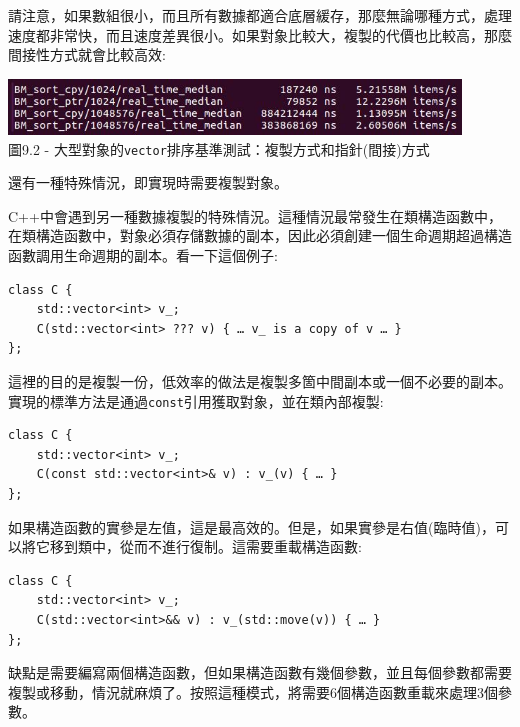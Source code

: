 請注意，如果數組很小，而且所有數據都適合底層緩存，那麼無論哪種方式，處理速度都非常快，而且速度差異很小。如果對象比較大，複製的代價也比較高，那麼間接性方式就會比較高效:

\begin{center}
\includegraphics[width=0.9\textwidth]{content/3/chapter9/images/2.jpg}\\
圖9.2 - 大型對象的\texttt{vector}排序基準測試：複製方式和指針(間接)方式
\end{center}

還有一種特殊情況，即實現時需要複製對象。


C++中會遇到另一種數據複製的特殊情況。這種情況最常發生在類構造函數中，在類構造函數中，對象必須存儲數據的副本，因此必須創建一個生命週期超過構造函數調用生命週期的副本。看一下這個例子:

\begin{lstlisting}[style=styleCXX]
class C {
	std::vector<int> v_;
	C(std::vector<int> ??? v) { … v_ is a copy of v … }
};
\end{lstlisting}

這裡的目的是複製一份，低效率的做法是複製多箇中間副本或一個不必要的副本。實現的標準方法是通過\texttt{const}引用獲取對象，並在類內部複製:

\begin{lstlisting}[style=styleCXX]
class C {
	std::vector<int> v_;
	C(const std::vector<int>& v) : v_(v) { … }
};
\end{lstlisting}

如果構造函數的實參是左值，這是最高效的。但是，如果實參是右值(臨時值)，可以將它移到類中，從而不進行復制。這需要重載構造函數:

\begin{lstlisting}[style=styleCXX]
class C {
	std::vector<int> v_;
	C(std::vector<int>&& v) : v_(std::move(v)) { … }
};
\end{lstlisting}

缺點是需要編寫兩個構造函數，但如果構造函數有幾個參數，並且每個參數都需要複製或移動，情況就麻煩了。按照這種模式，將需要6個構造函數重載來處理3個參數。

